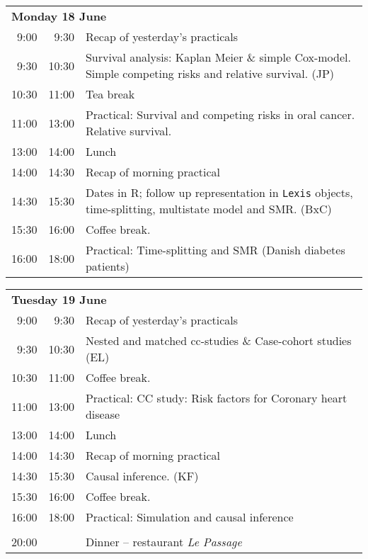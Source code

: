 \noindent
\begin{tabular}{r@{ -- }rp{13cm}}
\multicolumn{3}{l}{\bf Monday 18 June} \\
 9:00 &  9:30 & Recap of yesterday's practicals \\
 9:30 & 10:30 & Survival analysis: Kaplan Meier \& simple
                Cox-model. Simple competing risks and relative
                survival. (JP)\\
10:30 & 11:00 & Tea break\\
11:00 & 13:00 & Practical: Survival and competing risks in oral \newline
                           cancer. Relative survival.\\
13:00 & 14:00 & Lunch \\
14:00 & 14:30 & Recap of morning practical \\
14:30 & 15:30 & Dates in R; follow up representation in \texttt{Lexis} objects,
                time-splitting, multistate model and SMR. (BxC)\\
15:30 & 16:00 & Coffee break. \\
16:00 & 18:00 & Practical: Time-splitting and SMR (Danish diabetes patients)\\[1em]
\end{tabular}

\noindent
\begin{tabular}{r@{ -- }rp{13cm}}
\multicolumn{3}{l}{\bf Tuesday 19 June} \\
 9:00 &  9:30 & Recap of yesterday's practicals \\
 9:30 & 10:30 & Nested and matched cc-studies \& Case-cohort studies (EL) \\
10:30 & 11:00 & Coffee break. \\
11:00 & 13:00 & Practical: CC study: Risk factors for Coronary heart disease\\
13:00 & 14:00 & Lunch \\
14:00 & 14:30 & Recap of morning practical \\
14:30 & 15:30 & Causal inference. (KF)\\
15:30 & 16:00 & Coffee break. \\
16:00 & 18:00 & Practical: Simulation and causal inference\\
      &       & \\
20:00 &       & Dinner -- restaurant {\em Le Passage}\\[1em]
\end{tabular}

